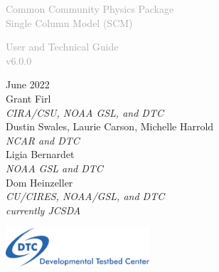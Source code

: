 \begin{titlepage}
\renewcommand{\thefootnote}{\fnsymbol{footnote}}

\vspace*{1em}
\noindent

\begin{center}
\textcolor{darkgray}{\bigsf Common Community Physics Package\\[0.5ex] Single Column Model (SCM)}
\vspace*{1em}\par

\textcolor{darkgray}{\bigst User and Technical Guide\\[0.5ex] v6.0.0}
\vspace*{1em}\par

\large{June 2022}\\

Grant Firl\\
\textit{\small{CIRA/CSU, NOAA GSL, and DTC}}\\[4em]

Dustin Swales, Laurie Carson, Michelle Harrold\\
\textit{\small{NCAR and DTC}}\\[4em]

Ligia Bernardet\\
\textit{\small{NOAA GSL and DTC}}\\[4em]

Dom Heinzeller\\
\textit{\small{CU/CIRES, NOAA/GSL, and DTC}}\\
\textit{\small{currently JCSDA}}\\[4em]

\vspace{4em}

\includegraphics[width=0.4\textwidth]{images/dtc_logo.png}\\[2em]

\end{center}
\end{titlepage}
\pagebreak{}
